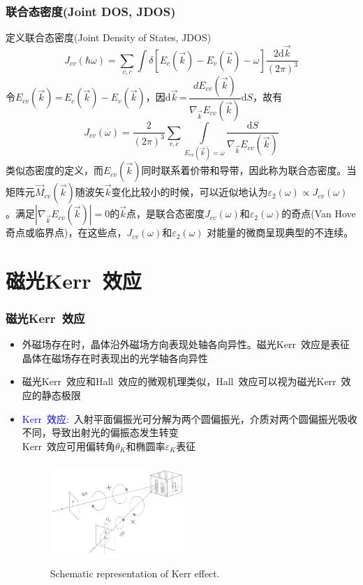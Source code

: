 \documentclass[cjk,slidestop,compress,mathserif,blue]{beamer}
\begin{document}
\frame
{
\frametitle{联合态密度(Joint DOS, JDOS)}
定义联合态密度(\textrm{Joint Density of States, JDOS})
\begin{displaymath}
  J_{cv}(\hbar\omega)=\sum_{v,c}\int\delta[E_c(\vec k)-E_v(\vec k)-\omega]\frac{2\textrm{d}\vec k}{(2\pi)^3}
  \label{eq:optic-33}
\end{displaymath}
令$E_{cv}(\vec k)$\,=\,$E_c(\vec k)-E_v(\vec k)$，因$\textrm{d}\vec k$\,=\,$\dfrac{dE_{cv}(\vec k)}{\nabla_{\vec k}E_{cv}(\vec k)}\textrm{d}S$，故有
\begin{displaymath}
  J_{cv}(\omega)=\frac2{(2\pi)^3}\sum_{v,c}\int\limits_{E_{cv}(\vec k)=\omega}\frac{\textrm{d}S}{\nabla_{\vec k}E_{cv}(\vec k)}
  \label{eq:optic-34}
\end{displaymath}
类似态密度的定义，而$E_{cv}(\vec k)$同时联系着价带和导带，因此称为联合态密度。当矩阵元$\vec M_{cv}(\vec k)$随波矢$\vec k$变化比较小的时候，可以近似地认为$\varepsilon_2(\omega)\!\propto\!J_{cv}(\omega)$。满足$|\nabla_{\vec k}E_{cv}(\vec k)|\!=\!0$的$\vec k$点，是联合态密度$J_{cv}(\omega)$和$\varepsilon_2(\omega)$的奇点(\textrm{Van Hove}奇点或临界点)，在这些点，$J_{cv}(\omega)$和$\varepsilon_2(\omega)$%
对能量的微商呈现典型的不连续。%
}

\section{磁光\rm{Kerr~}效应}
\frame
{
	\frametitle{磁光\textrm{Kerr~}效应}
	\begin{itemize}
		\item 外磁场存在时，晶体沿外磁场方向表现处轴各向异性。磁光\textrm{Kerr~}效应是表征晶体在磁场存在时表现出的光学轴各向异性
		\item 磁光\textrm{Kerr~}效应和\textrm{Hall~}效应的微观机理类似，\textrm{Hall~}效应可以视为磁光\textrm{Kerr~}效应的静态极限
		\item \textcolor{blue}{\textrm{Kerr~}效应}:~入射平面偏振光可分解为两个圆偏振光，介质对两个圆偏振光吸收不同，导致出射光的偏振态发生转变\\\textrm{Kerr~}效应可用偏转角$\theta_K$和椭圆率$\varepsilon_K$表征
\begin{figure}[h!]
\centering
\vspace*{-0.4in}
\includegraphics[height=1.5in,width=2.0in,viewport=0 0 750 550,clip]{Figures/Magopt_Kerr.png}
\caption{\small \textrm{Schematic representation of Kerr effect.}}%
\label{Optic-Kerr}
\end{figure} 
	\end{itemize}
}
\end{document}
